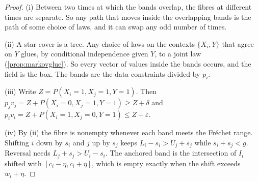 \documentclass[11pt]{article}
\theoremstyle{definition}\newtheorem{definition}[theorem]{Definition}\newtheorem{remark}[theorem]{Remark}\newtheorem{example}[theorem]{Example}\newtheorem{problem}[theorem]{Open problem}\crefname{problem}{Problem}{Problems}
\begin{document}
\begin{proof}
(i) Between two times at which the bands overlap, the fibres at different times are separate. So any path that moves inside the overlapping bands is the path of some choice of laws, and it can swap any odd number of times.

(ii) A star cover is a tree. Any choice of laws on the contexts $\{X_i,Y\}$ that agree on $Y$ glues, by conditional independence given $Y$, to a joint law (\cref{prop:markovglue}). So every vector of values inside the bands occurs, and the field is the box. The bands are the data constraints divided by $p_i$.

(iii) Write $Z=P(X_i=1,X_j=1,Y=1)$. Then $p_jv_j=Z+P(X_i=0,X_j=1,Y=1)\ge Z+\delta$ and $p_iv_i=Z+P(X_i=1,X_j=0,Y=1)\le Z+\varepsilon$.

(iv) By (ii) the fibre is nonempty whenever each band meets the Fr\'echet range. Shifting $i$ down by $s_i$ and $j$ up by $s_j$ keeps $L_i-s_i>U_j+s_j$ while $s_i+s_j<g$. Reversal needs $L_j+s_j>U_i-s_i$. The anchored band is the intersection of $I_i$ shifted with $[c_i-\eta,c_i+\eta]$, which is empty exactly when the shift exceeds $w_i+\eta$.
\end{proof}
\end{document}

